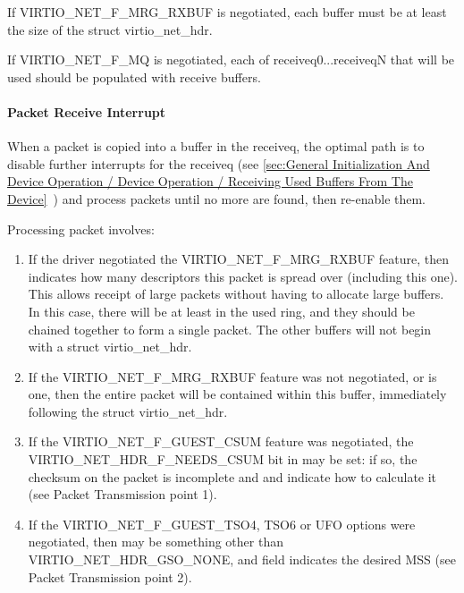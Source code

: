If VIRTIO_NET_F_MRG_RXBUF is negotiated, each buffer must be at
least the size of the struct virtio_net_hdr.

If VIRTIO_NET_F_MQ is negotiated, each of receiveq0...receiveqN
that will be used should be populated with receive buffers.

\paragraph{Packet Receive Interrupt}\label{sec:Device Types / Network Device / Device Operation / Setting Up Receive Buffers / Packet Receive Interrupt}

When a packet is copied into a buffer in the receiveq, the
optimal path is to disable further interrupts for the receiveq
(see \ref{sec:General Initialization And Device Operation / Device Operation / Receiving Used Buffers From The Device}~) and process
packets until no more are found, then re-enable them.

Processing packet involves:

\begin{enumerate}
\item If the driver negotiated the VIRTIO_NET_F_MRG_RXBUF feature,
  then  indicates how many descriptors
  this packet is spread over (including this one). This allows
  receipt of large packets without having to allocate large
  buffers. In this case, there will be at least  in
  the used ring, and they should be chained together to form a
  single packet. The other buffers will not begin with a struct
  virtio_net_hdr.

\item If the VIRTIO_NET_F_MRG_RXBUF feature was not negotiated, or
   is one, then the entire packet will be
  contained within this buffer, immediately following the struct
  virtio_net_hdr.

\item If the VIRTIO_NET_F_GUEST_CSUM feature was negotiated, the
  VIRTIO_NET_HDR_F_NEEDS_CSUM bit in  may be
  set: if so, the checksum on the packet is incomplete and
   and  indicate how to calculate
  it (see Packet Transmission point 1).

\item If the VIRTIO_NET_F_GUEST_TSO4, TSO6 or UFO options were
  negotiated, then  may be something other than
  VIRTIO_NET_HDR_GSO_NONE, and  field indicates the
  desired MSS (see Packet Transmission point 2).
\end{enumerate}

